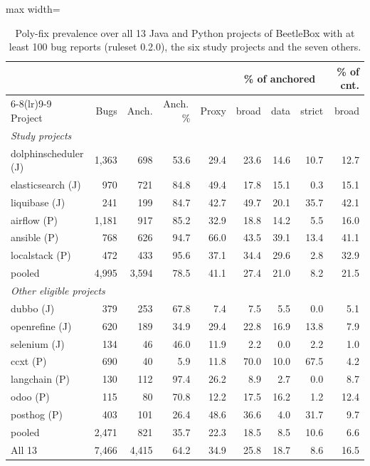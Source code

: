 \begin{table}[t]
\caption{Poly-fix prevalence over all 13 Java and Python projects of BeetleBox with at least 100 bug reports (ruleset 0.2.0), the six study projects and the seven others.}
\label{tab:rq1all}
\small
\setlength{\tabcolsep}{3pt}
\begin{adjustbox}{max width=\linewidth}\begin{tabular}{lrrrrrrrr}
\toprule
 & & & & & \multicolumn{3}{c}{\% of anchored} & \% of cnt. \\
\cmidrule(lr){6-8}\cmidrule(lr){9-9}
Project & Bugs & Anch. & Anch.\,\% & Proxy & broad & data & strict & broad \\
\midrule
\multicolumn{9}{l}{\emph{Study projects}} \\
dolphinscheduler (J) & 1{,}363 & 698 & 53.6 & 29.4 & 23.6 & 14.6 & 10.7 & 12.7 \\
elasticsearch (J) & 970 & 721 & 84.8 & 49.4 & 17.8 & 15.1 & 0.3 & 15.1 \\
liquibase (J) & 241 & 199 & 84.7 & 42.7 & 49.7 & 20.1 & 35.7 & 42.1 \\
airflow (P) & 1{,}181 & 917 & 85.2 & 32.9 & 18.8 & 14.2 & 5.5 & 16.0 \\
ansible (P) & 768 & 626 & 94.7 & 66.0 & 43.5 & 39.1 & 13.4 & 41.1 \\
localstack (P) & 472 & 433 & 95.6 & 37.1 & 34.4 & 29.6 & 2.8 & 32.9 \\
\quad pooled & 4{,}995 & 3{,}594 & 78.5 & 41.1 & 27.4 & 21.0 & 8.2 & 21.5 \\
\midrule
\multicolumn{9}{l}{\emph{Other eligible projects}} \\
dubbo (J) & 379 & 253 & 67.8 & 7.4 & 7.5 & 5.5 & 0.0 & 5.1 \\
openrefine (J) & 620 & 189 & 34.9 & 29.4 & 22.8 & 16.9 & 13.8 & 7.9 \\
selenium (J) & 134 & 46 & 46.0 & 11.9 & 2.2 & 0.0 & 2.2 & 1.0 \\
ccxt (P) & 690 & 40 & 5.9 & 11.8 & 70.0 & 10.0 & 67.5 & 4.2 \\
langchain (P) & 130 & 112 & 97.4 & 26.2 & 8.9 & 2.7 & 0.0 & 8.7 \\
odoo (P) & 115 & 80 & 70.8 & 12.2 & 17.5 & 16.2 & 1.2 & 12.4 \\
posthog (P) & 403 & 101 & 26.4 & 48.6 & 36.6 & 4.0 & 31.7 & 9.7 \\
\quad pooled & 2{,}471 & 821 & 35.7 & 22.3 & 18.5 & 8.5 & 10.6 & 6.6 \\
\midrule
All 13 & 7{,}466 & 4{,}415 & 64.2 & 34.9 & 25.8 & 18.7 & 8.6 & 16.5 \\

\end{tabular}
\end{adjustbox}
\end{table}
